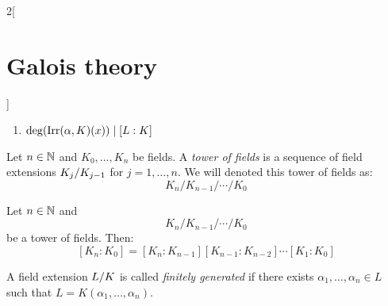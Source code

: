 \documentclass[../../../main.tex]{subfiles}
\begin{document}
\begin{multicols}{2}[\section{Galois theory}]
\begin{prop}
\begin{enumerate}
      \item $\deg(\operatorname{Irr}(\alpha,K)(x))\mid [L:K]$
    \end{enumerate}
  \end{prop}
  \begin{definition}
    Let $n\in\mathbb{N}$ and $K_0,\ldots,K_n$ be fields. A \textit{tower of fields} is a sequence of field extensions $\quot{K_j}{K_{j-1}}$ for $j=1,\ldots,n$. We will denoted this tower of fields as: $$K_n/K_{n-1}/\cdots/K_0$$
  \end{definition}
  \begin{corollary}
    Let $n\in\mathbb{N}$ and $$K_n/K_{n-1}/\cdots/K_0$$ be a tower of fields. Then: $$[K_n:K_0]=[K_n:K_{n-1}][K_{n-1}:K_{n-2}]\cdots[K_1:K_0]$$
  \end{corollary}
  \begin{definition}
    A field extension $\quot{L}{K}$ is called \textit{finitely generated} if there exists $\alpha_1,\ldots,\alpha_n\in L$ such that $L=K(\alpha_1,\ldots,\alpha_n)$.
  \end{definition}

\end{multicols}
\end{document}
